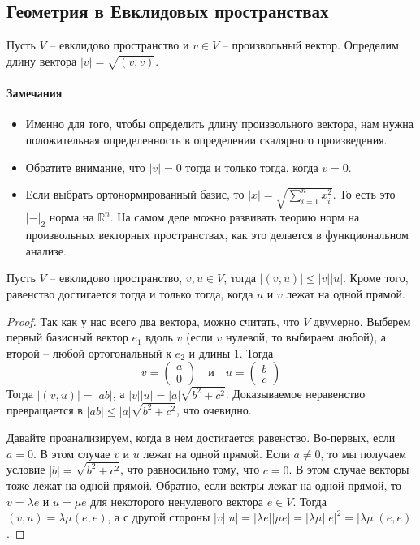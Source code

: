 \subsection{Геометрия в Евклидовых пространствах}


\begin{definition}
Пусть $V$ -- евклидово пространство и $v\in V$ -- произвольный вектор. Определим длину вектора $|v| = \sqrt{(v,v)}$.
\end{definition}

\paragraph{Замечания}
\begin{itemize}
\item Именно для того, чтобы определить длину произвольного вектора, нам нужна положительная определенность в определении скалярного произведения. 

\item Обратите внимание, что $|v| = 0$ тогда и только тогда, когда $v = 0$.

\item Если выбрать ортонормированный базис, то $|x| = \sqrt{\sum_{i=1}^n x_i^2}$. То есть это $|{-}|_2$ норма на $\mathbb R^n$. На самом деле можно развивать теорию норм на произвольных векторных пространствах, как это делается в функциональном анализе.
\end{itemize}

\begin{claim}
Пусть $V$ -- евклидово пространство, $v,u\in V$, тогда $|(v,u)|\leqslant |v| |u|$. Кроме того, равенство достигается тогда и только тогда, когда $u$ и $v$ лежат на одной прямой.
\end{claim}
\begin{proof}
Так как у нас всего два вектора, можно считать, что $V$ двумерно. Выберем первый базисный вектор $e_1$ вдоль $v$ (если $v$ нулевой, то выбираем любой), а второй -- любой ортогональный к $e_2$ и длины $1$. Тогда
\[
v = 
\begin{pmatrix}
{a}\\{0}
\end{pmatrix}
\quad\text{и}\quad
u = 
\begin{pmatrix}
{b}\\{c}
\end{pmatrix}
\]
Тогда $|(v, u)| = |ab|$, а $|v||u| = |a|\sqrt{b^2 + c^2}$. Доказываемое неравенство превращается в $|ab|\leqslant |a|\sqrt{b^2 + c^2}$, что очевидно.

Давайте проанализируем, когда в нем достигается равенство. Во-первых, если $a = 0$. В этом случае $v$ и $u$ лежат на одной прямой. Если $a \neq 0$, то мы получаем условие $|b| = \sqrt{b^2 + c^2}$, что равносильно тому, что $c = 0$. В этом случае векторы тоже лежат на одной прямой. Обратно, если вектры лежат на одной прямой, то $v = \lambda e$ и $u = \mu e$ для некоторого ненулевого вектора $e\in V$. Тогда $(v,u) = \lambda\mu (e,e)$, а с другой стороны $|v||u| = |\lambda e||\mu e| = |\lambda \mu| |e|^2 = |\lambda \mu|(e,e)$.
\end{proof}

